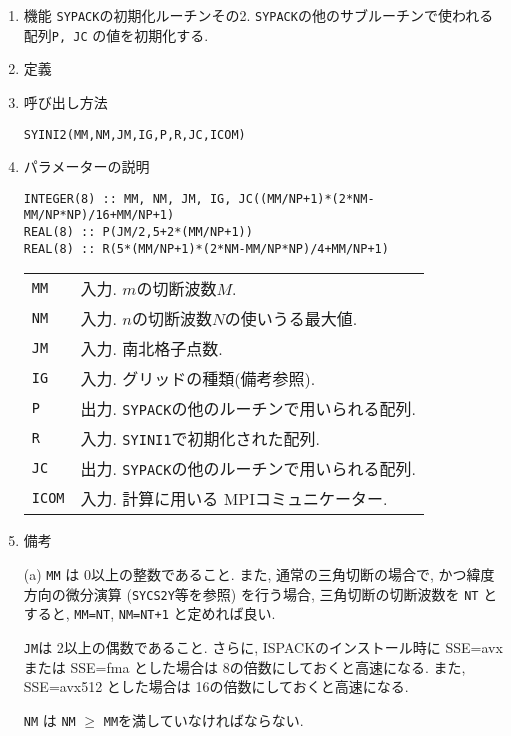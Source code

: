 \documentclass[a4j]{jsarticle}
\begin{document}
\begin{enumerate}

\item 機能
\texttt{SYPACK}の初期化ルーチンその2.
\texttt{SYPACK}の他のサブルーチンで使われる配列\texttt{P, JC}
の値を初期化する.

\item 定義

\item 呼び出し方法 
    
\texttt{SYINI2(MM,NM,JM,IG,P,R,JC,ICOM)}
  
\item パラメーターの説明

\begin{verbatim}  
INTEGER(8) :: MM, NM, JM, IG, JC((MM/NP+1)*(2*NM-MM/NP*NP)/16+MM/NP+1)
REAL(8) :: P(JM/2,5+2*(MM/NP+1))
REAL(8) :: R(5*(MM/NP+1)*(2*NM-MM/NP*NP)/4+MM/NP+1)
\end{verbatim}  
    
\begin{tabular}{ll}
\texttt{MM} & 入力. $m$の切断波数$M$.\\
\texttt{NM} & 入力. $n$の切断波数$N$の使いうる最大値.\\
\texttt{JM} & 入力. 南北格子点数.\\
\texttt{IG} & 入力. グリッドの種類(備考参照).\\
\texttt{P}  & 出力. \texttt{SYPACK}の他のルーチンで用いられる配列.\\
\texttt{R}  & 入力. \texttt{SYINI1}で初期化された配列.\\
\texttt{JC}  & 出力. \texttt{SYPACK}の他のルーチンで用いられる配列.\\
\texttt{ICOM} & 入力. 計算に用いる MPIコミュニケーター.
\end{tabular}

\item 備考

(a) \texttt{MM} は 0以上の整数であること.
     また, 通常の三角切断の場合で, かつ緯度方向の微分演算
     (\texttt{SYCS2Y}等を参照)
     を行う場合, 三角切断の切断波数を \texttt{NT} とすると,
     \texttt{MM=NT},  \texttt{NM=NT+1} と定めれば良い.
     
\texttt{JM}は 2以上の偶数であること. さらに, ISPACKのインストール時に
SSE=avx または SSE=fma とした場合は 8の倍数にしておくと高速になる.
また, SSE=avx512 とした場合は 16の倍数にしておくと高速になる.

\texttt{NM} は \texttt{NM} $\ge$ \texttt{MM}を満していなければならない.


\end{enumerate}
\end{document}
